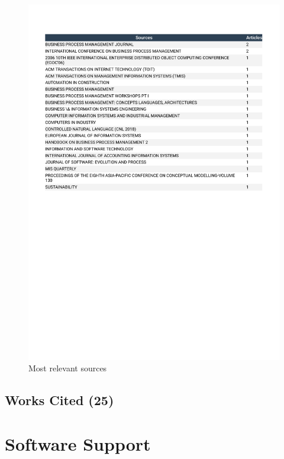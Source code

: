 \documentclass[
  letterpaper,
  DIV=11,
  numbers=noendperiod]{scrreprt}
\begin{document}
\begin{figure}

{\centering \includegraphics{./static/Most_Relevant_Sources.pdf}

}

\caption{\label{fig-sources}Most relevant sources}

\end{figure}

\newpage{}

\hypertarget{works-cited-25}{%
\section{Works Cited (25)}\label{works-cited-25}}

\hypertarget{software-support}{%
\chapter{Software Support}\label{software-support}}
\end{document}
